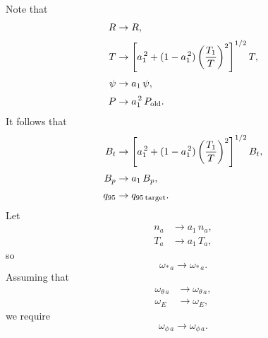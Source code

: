 \documentclass[12pt]{article}
\begin{document}
Note that
\begin{align}
R&\rightarrow R,\\[0.5ex]
T &\rightarrow  \left[a_1^{\,2}+ (1-a_1^{\,2})\left(\frac{T_{1}}{T}\right)^2\right]^{1/2}T,\\[0.5ex]
\psi&\rightarrow a_1\,\psi,\\[0.5ex]
P &\rightarrow a_1^{\,2}\,P_{\rm old}.
\end{align}
It follows that
\begin{align}
B_t&\rightarrow \left[a_1^{\,2}+ (1-a_1^{\,2})\left(\frac{T_{1}}{T}\right)^2\right]^{1/2}B_t,\\[0.5ex]
B_p &\rightarrow a_1\,B_p,\\[0.5ex]
q_{95} &\rightarrow q_{95\,{\rm target}}.
\end{align}
Let
\begin{align}
n_a&\rightarrow a_1\,n_a,\\[0.5ex]
T_a&\rightarrow a_1\,T_a,
\end{align}
so
\begin{equation}
\omega_{\ast\,a} \rightarrow \omega_{\ast\,a}.
\end{equation}
Assuming that
\begin{align}
\omega_{\theta\,a}&\rightarrow \omega_{\theta\,a},\\[0.5ex]
\omega_E &\rightarrow \omega_E,
\end{align}
we require 
\begin{equation}
\omega_{\phi\,a}\rightarrow \omega_{\phi\,a}.
\end{equation}
\end{document}
